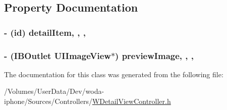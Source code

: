 \subsection{Property Documentation}
\hypertarget{interface_w_detail_view_controller_aed10c0ee23cc4e552b6698c89ecaff0d}{
\subsubsection[{detail\-Item}]{\setlength{\rightskip}{0pt plus 5cm}-\/ (id) detail\-Item\hspace{0.3cm}{\ttfamily [read]}, {\ttfamily [write]}, {\ttfamily [nonatomic]}, {\ttfamily [strong]}}}\label{interface_w_detail_view_controller_aed10c0ee23cc4e552b6698c89ecaff0d}
\hypertarget{interface_w_detail_view_controller_a3acd4a1ff876ea51e2c5287f64dc75b4}{
\subsubsection[{preview\-Image}]{\setlength{\rightskip}{0pt plus 5cm}-\/ (I\-B\-Outlet U\-I\-Image\-View$\ast$) preview\-Image\hspace{0.3cm}{\ttfamily [read]}, {\ttfamily [write]}, {\ttfamily [nonatomic]}, {\ttfamily [weak]}}}\label{interface_w_detail_view_controller_a3acd4a1ff876ea51e2c5287f64dc75b4}


The documentation for this class was generated from the following file\-:\begin{DoxyCompactItemize}
\item 
/\-Volumes/\-User\-Data/\-Dev/woda-\/iphone/\-Sources/\-Controllers/\hyperlink{_w_detail_view_controller_8h}{W\-Detail\-View\-Controller.\-h}\end{DoxyCompactItemize}
